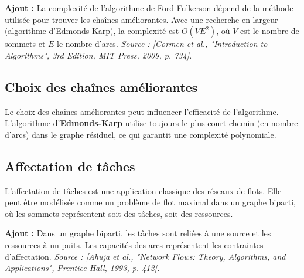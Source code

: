 \documentclass[10pt,a4paper]{article}
\begin{document}
\textbf{Ajout :} La complexité de l'algorithme de Ford-Fulkerson dépend de la méthode utilisée pour trouver les chaînes améliorantes. Avec une recherche en largeur (algorithme d'Edmonds-Karp), la complexité est \( O(VE^2) \), où \( V \) est le nombre de sommets et \( E \) le nombre d'arcs. \textit{Source : [Cormen et al., "Introduction to Algorithms", 3rd Edition, MIT Press, 2009, p. 734].}

\subsection*{Choix des chaînes améliorantes}

Le choix des chaînes améliorantes peut influencer l'efficacité de l'algorithme. L'algorithme d'\textbf{Edmonds-Karp} utilise toujours le plus court chemin (en nombre d'arcs) dans le graphe résiduel, ce qui garantit une complexité polynomiale.


\subsection*{Affectation de tâches}

L'affectation de tâches est une application classique des réseaux de flots. Elle peut être modélisée comme un problème de flot maximal dans un graphe biparti, où les sommets représentent soit des tâches, soit des ressources.

\textbf{Ajout :} Dans un graphe biparti, les tâches sont reliées à une source et les ressources à un puits. Les capacités des arcs représentent les contraintes d'affectation. \textit{Source : [Ahuja et al., "Network Flows: Theory, Algorithms, and Applications", Prentice Hall, 1993, p. 412].}
\end{document}
